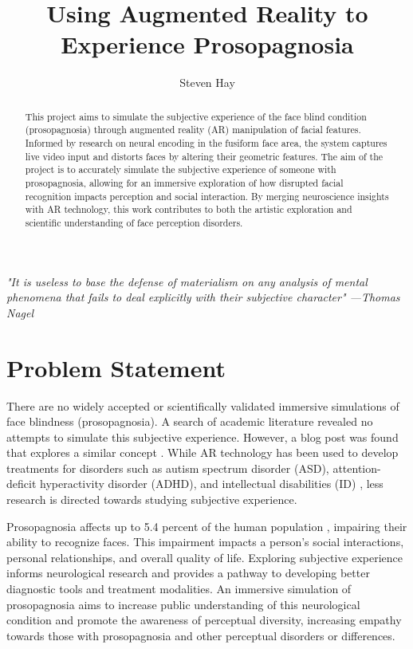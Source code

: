 \documentclass{article}
\title{
    Using Augmented Reality to Experience Prosopagnosia
}
\author{Steven Hay}
\begin{document}
    \maketitle
    
    \begin{abstract}
        This project aims to simulate the subjective experience of the face blind condition (prosopagnosia) through augmented reality (AR) manipulation of facial features. Informed by research on neural encoding in the fusiform face area, the system captures live video input and distorts faces by altering their geometric features. The aim of the project is to accurately simulate the subjective experience of someone with prosopagnosia, allowing for an immersive exploration of how disrupted facial recognition impacts perception and social interaction. By merging neuroscience insights with AR technology, this work contributes to both the artistic exploration and scientific understanding of face perception disorders.
    \end{abstract}

    \quotation \textit{
        "It is useless to base the defense of materialism on any analysis of mental phenomena that fails to deal explicitly with their subjective character" \nocite{nagel_1974} \hspace{1em plus 1fill}---Thomas Nagel}
    
    \section{Problem Statement}
    There are no widely accepted or scientifically validated immersive simulations of face blindness (prosopagnosia). A search of academic literature revealed no attempts to simulate this subjective experience. However, a blog post was found that explores a similar concept \cite{bieber_2021}. While AR technology has been used to develop treatments for disorders such as autism spectrum disorder (ASD), attention-deficit hyperactivity disorder (ADHD), and intellectual disabilities (ID) \cite{bakir_2023}, less research is directed towards studying subjective experience.
    
    Prosopagnosia affects up to 5.4 percent of the human population \cite{degutis_2023}, impairing their ability to recognize faces. This impairment impacts a person's social interactions, personal relationships, and overall quality of life. Exploring subjective experience informs neurological research and provides a pathway to developing better diagnostic tools and treatment modalities. An immersive simulation of prosopagnosia aims to increase public understanding of this neurological condition and promote the awareness of perceptual diversity, increasing empathy towards those with prosopagnosia and other perceptual disorders or differences.
        
\end{document}
